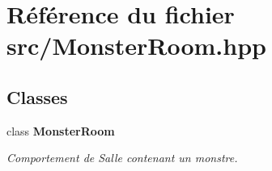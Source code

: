 \section{Référence du fichier src/\-Monster\-Room.hpp}
\label{_monster_room_8hpp}
\subsection*{Classes}
\begin{DoxyCompactItemize}
\item 
class {\bf Monster\-Room}
\begin{DoxyCompactList}\small\item\em Comportement de Salle contenant un monstre. \end{DoxyCompactList}\end{DoxyCompactItemize}

